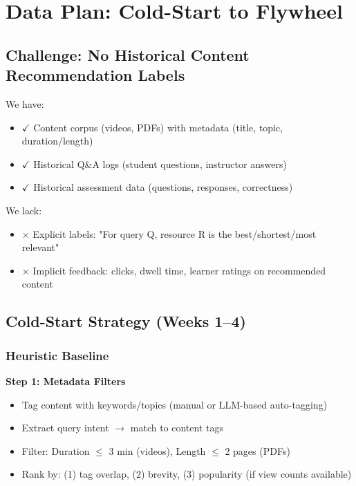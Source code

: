 \documentclass[11pt,letterpaper]{article}
\begin{document}
\newpage

\section{Data Plan: Cold-Start to Flywheel}\label{sec:data-plan}

\subsection{Challenge: No Historical Content Recommendation Labels}\label{subsec:challenge-no-labels}

We have:
\begin{itemize}
\item $\checkmark$ Content corpus (videos, PDFs) with metadata (title, topic, duration/length)
\item $\checkmark$ Historical Q\&A logs (student questions, instructor answers)
\item $\checkmark$ Historical assessment data (questions, responses, correctness)
\end{itemize}

We lack:
\begin{itemize}
\item $\times$ Explicit labels: "For query Q, resource R is the best/shortest/most relevant"
\item $\times$ Implicit feedback: clicks, dwell time, learner ratings on recommended content
\end{itemize}

\subsection{Cold-Start Strategy (Weeks 1--4)}\label{subsec:cold-start-strategy}

\subsubsection{Heuristic Baseline}\label{subsubsec:heuristic-baseline}

\textbf{Step 1: Metadata Filters}
\begin{itemize}
\item Tag content with keywords/topics (manual or LLM-based auto-tagging)
\item Extract query intent $\rightarrow$ match to content tags
\item Filter: Duration $\leq$ 3 min (videos), Length $\leq$ 2 pages (PDFs)
\item Rank by: (1) tag overlap, (2) brevity, (3) popularity (if view counts available)
\end{itemize}
\end{document}

